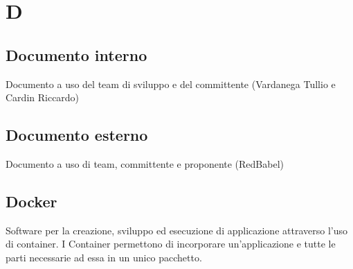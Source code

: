 \section*{D}
\subsection*{Documento interno}
Documento a uso del team di sviluppo e del committente (Vardanega Tullio e Cardin Riccardo)

\subsection*{Documento esterno}
Documento a uso di team, committente e proponente (RedBabel)

\subsection*{Docker}
Software per la creazione, sviluppo ed esecuzione di applicazione attraverso l’uso di container. I Container
permettono di incorporare un’applicazione e tutte le parti necessarie ad essa in un unico pacchetto.

